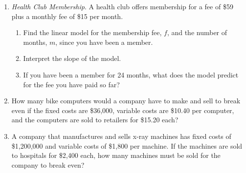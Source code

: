 \documentclass[12pt, twoside]{report}
\begin{document}
	


\pagebreak



\begin{enumerate}
    
  	\item \emph{Health Club Membership}. A health club offers membership for a fee of \$59 plus a monthly fee of \$15 per month.
  		\begin{enumerate}
  			\item Find the linear model for the membership fee, $f$, and the  number of months, $m$, since you have been a member.


		  	\item Interpret the slope of the model.


		  	\item If you have been a member for 24 months, what does the model predict for the fee you have paid so far?

  \end{enumerate}
  \vfill 
 
 
 
 \pagebreak
 
 
 
	\item How many bike computers would a company have to make and sell to break even if the fixed costs are \$36,000, variable costs are \$10.40 per computer, and the computers are sold to retailers for \$15.20 each? \vfill




	\item A company that manufactures and sells x-ray machines has fixed costs of \$1,200,000 and variable costs of \$1,800 per machine. If the machines are sold to hospitals for \$2,400 each, how many machines must be sold for the company to break even? \vfill

\end{enumerate}
\end{document}
